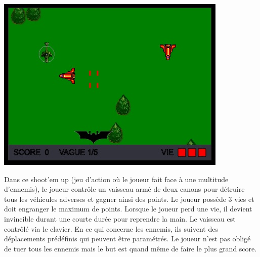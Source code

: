 \begin{minipage}{6cm}
\includegraphics[width=\linewidth]{img/capturejeu_1942}
\end{minipage}
\hfill
\begin{minipage}{9cm}
Dans ce shoot'em up (jeu d’action où le joueur fait face à une multitude d’ennemis), 
le joueur contrôle un vaisseau armé de deux canons pour détruire tous les véhicules adverses et gagner ainsi des points. 
Le joueur possède 3 vies et doit engranger le maximum de points. Lorsque le joueur perd une vie, il devient invincible durant une courte durée 
pour reprendre la main. Le vaisseau est contrôlé via le clavier. En ce qui concerne les ennemis, 
ils suivent des déplacements prédéfinis qui peuvent être paramétrés. 
Le joueur n’est pas obligé de tuer tous les ennemis mais le but est quand même de faire le plus grand score.
\end{minipage}

